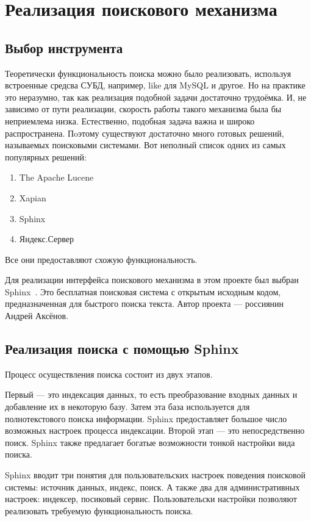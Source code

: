 \section{Реализация поискового механизма}


\subsection{Выбор инструмента}

Теоретически функциональность поиска можно было реализовать, используя
встроенные средсва СУБД, например, like для MySQL и другое.
Но на практике это неразумно, так как реализация подобной задачи 
достаточно трудоёмка.
И, не зависимо от пути реализации, скорость работы такого механизма была бы неприемлема низка.
Естественно, подобная задача важна и широко распространена.
Пoэтому существуют достаточно много готовых решений, называемых поисковыми системами.
Вот неполный список одних из самых популярных решений:
\begin{enumerate}
    \item The Apache Lucene 
    \item Xapian
    \item Sphinx
    \item Яндекс.Сервер
\end{enumerate}

Все они предоставляют схожую функциональность.

Для реализации интерфейса поискового механизма в этом проекте был выбран Sphinx~\cite{sphinx}. 
Это бесплатная поисковая система с открытым исходным кодом, 
предназначенная для быстрого поиска текста. 
Автор проекта --- россиянин Андрей Аксёнов.

\subsection{Реализация поиска с помощью Sphinx}

Процесс осуществления поиска состоит из двух этапов.

Первый --- это индексация данных, то есть преобразование входных данных и добавление их в некоторую базу.
Затем эта база используется для полнотекстового поиска информации.
Sphinx предоставляет большое число возможных настроек процесса индексации.
Второй этап --- это непосредственно поиск. Sphinx также предлагает богатые возможности тонкой настройки вида поиска.

Sphinx вводит три понятия для пользовательских настроек поведения поисковой системы: источник данных, индекс, поиск.
А также два для административных настроек: индексер, посиковый сервис.
Пользовательски настройки позволяют реализовать требуемую функциональность поиска.

